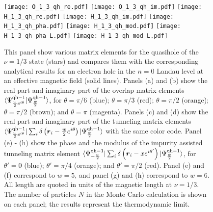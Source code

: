 \documentclass[twocolumn,floatfix,prb,aps,showpacs]{revtex4-2}
\renewcommand{\vec}[1]{\mbox{\boldmath$#1$}}
\begin{document}
\begin{appendix}
\begin{figure}[]
	\texttt{[image: O\_1\_3\_qh\_re.pdf]} 
	\texttt{[image: O\_1\_3\_qh\_im.pdf]} 
    \texttt{[image: H\_1\_3\_qh\_re.pdf]} 
	\texttt{[image: H\_1\_3\_qh\_im.pdf]} 
    \texttt{[image: H\_1\_3\_qh\_pha.pdf]} 
	\texttt{[image: H\_1\_3\_qh\_mod.pdf]} 
   \texttt{[image: H\_1\_3\_qh\_pha\_L.pdf]} 
	\texttt{[image: H\_1\_3\_qh\_mod\_L.pdf]} 
	\caption{This panel show various matrix elements for the quasihole of the $\nu=1/3$ state (stars) and compares them with the corresponding analytical results for an electron hole in the $n=0$ Landau level at an effective magnetic field (solid lines). Panels (a) and (b) show the real part and imaginary part of the overlap matrix elements $\langle \Psi^{{\rm qh}-1}_{{w\over 2}e^{i\theta}}|\Psi^{{\rm qh}-1}_{w\over 2}\rangle$, for $\theta=\pi/6$ (blue); $\theta=\pi/3$ (red); $\theta=\pi/2$ (orange); $\theta=\pi/2$ (brown); and $\theta=\pi$ (magenta).  Panels (c) and (d) show the real part and imaginary part of the tunneling matrix elements $\langle \Psi^{{\rm qh}-1}_{{w\over 2}e^{i\theta}}|\sum_i \delta\left(\vec{r}_i-{w\over 2}e^{i\theta}\right)|\Psi^{{\rm qh}-1}_{w\over 2}\rangle$ with the same color code. Panel (e) - (h) show the phase and the modulus of the impurity assisted tunneling matrix element $\langle \Psi^{{\rm qh}-1}_{-{w\over 2}}|\sum_i \delta\left(\vec{r}_i-xe^{i\theta'}\right)|\Psi^{{\rm qh}-1}_{w\over 2}\rangle$, for $\theta'=0$ (blue);  $\theta'=\pi/4$ (orange); and $\theta'=\pi/2$ (red). Panel (e) and (f) correspond to $w=5$, and panel (g) and (h) correspond to $w=6$. All length are quoted in units of the magnetic length at $\nu=1/3$. The number of particles $N$ in the Monte Carlo calculation is shown on each panel; the results represent the thermodynamic limit.
 }
	\label{O13qh}
\end{figure}


\end{appendix}

%
%
\end{document}
